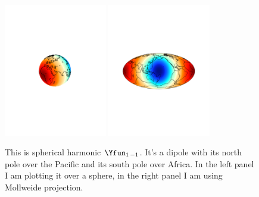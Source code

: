 \documentclass[11pt]{article}
\begin{document}
\begin{figure}[H]
\centering
\includegraphics[width=0.4\textwidth,trim = 7cm 10cm 7cm 10cm, clip]{figures/Y1m1}
\includegraphics[width=0.4\textwidth,trim = 3cm 9cm 3cm 10cm, clip]{figures/Y1m1_Mol}
\caption{This is spherical harmonic $\Yfun_{1\,-1}$. It's a dipole with its north pole over the Pacific and its south pole over Africa. In the left panel I am plotting it over a sphere, in the right panel I am using Mollweide projection.}
\label{Y1m1fig}
\end{figure}
 
\end{document}
